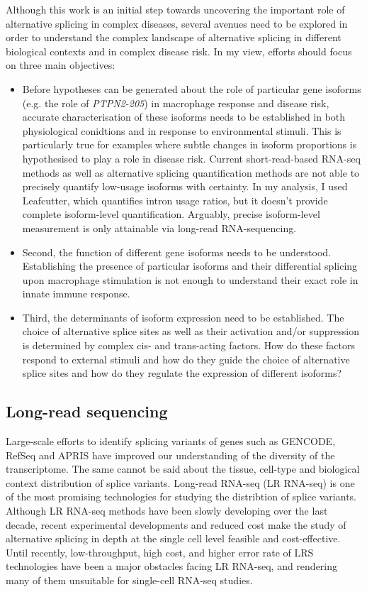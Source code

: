 Although this work is an initial step towards uncovering the important role of alternative splicing in complex diseases, several avenues need to be explored in order to understand the complex landscape of alternative splicing in different biological contexts and in complex disease risk. In my view, efforts should focus on three main objectives: 
\begin{itemize}
    \item Before hypotheses can be generated about the role of particular gene isoforms (e.g. the role of \textit{PTPN2-205}) in macrophage response and disease risk, accurate characterisation of these isoforms needs to be established in both physiological conidtions and in response to environmental stimuli. This is particularly true for examples where subtle changes in isoform proportions is hypothesised to play a role in disease risk. Current short-read-based RNA-seq methods as well as alternative splicing quantification methods are not able to precisely quantify low-usage isoforms with certainty. In my analysis, I used Leafcutter, which quantifies intron usage ratios, but it doesn't provide complete isoform-level quantification. Arguably, precise isoform-level measurement is only attainable via long-read RNA-sequencing.
    \item Second, the function of different gene isoforms needs to be understood. Establishing the presence of particular isoforms and their differential splicing upon macrophage stimulation is not enough to understand their exact role in innate immune response. 
    \item Third, the determinants of isoform expression need to be established. The choice of alternative splice sites as well as their activation and/or suppression is determined by complex cis- and trans-acting factors. How do these factors respond to external stimuli and how do they guide the choice of alternative splice sites and how do they regulate the expression of different isoforms? 
\end{itemize}

\subsection{Long-read sequencing}
Large-scale efforts to identify splicing variants of genes such as GENCODE, RefSeq and APRIS have improved our understanding of the diversity of the transcriptome. The same cannot be said about the tissue, cell-type and biological context distribution of splice variants. Long-read RNA-seq (LR RNA-seq) is one of the most promising technologies for studying the distribtion of splice variants. Although LR RNA-seq methods have been slowly developing over the last decade, recent experimental developments and reduced cost make the study of alternative splicing in depth at the single cell level feasible and cost-effective. Until recently, low-throughput, high cost, and higher error rate of LRS technologies have been a major obstacles facing LR RNA-seq, and rendering many of them unsuitable for single-cell RNA-seq studies. \\

